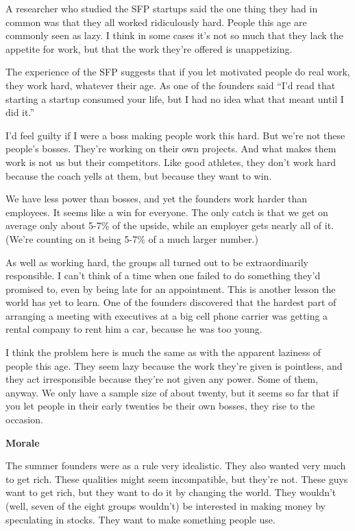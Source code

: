 A researcher who studied the SFP startups said the one thing they had in
common was that they all worked ridiculously hard. People this age are
commonly seen as lazy. I think in some cases it's not so much that they
lack the appetite for work, but that the work they're offered is
unappetizing.

The experience of the SFP suggests that if you let motivated people do
real work, they work hard, whatever their age. As one of the founders
said ``I'd read that starting a startup consumed your life, but I had no
idea what that meant until I did it.''

I'd feel guilty if I were a boss making people work this hard. But we're
not these people's bosses. They're working on their own projects. And
what makes them work is not us but their competitors. Like good
athletes, they don't work hard because the coach yells at them, but
because they want to win.

We have less power than bosses, and yet the founders work harder than
employees. It seems like a win for everyone. The only catch is that we
get on average only about 5-7\% of the upside, while an employer gets
nearly all of it. (We're counting on it being 5-7\% of a much larger
number.)

As well as working hard, the groups all turned out to be extraordinarily
responsible. I can't think of a time when one failed to do something
they'd promised to, even by being late for an appointment. This is
another lesson the world has yet to learn. One of the founders
discovered that the hardest part of arranging a meeting with executives
at a big cell phone carrier was getting a rental company to rent him a
car, because he was too young.

I think the problem here is much the same as with the apparent laziness
of people this age. They seem lazy because the work they're given is
pointless, and they act irresponsible because they're not given any
power. Some of them, anyway. We only have a sample size of about twenty,
but it seems so far that if you let people in their early twenties be
their own bosses, they rise to the occasion.

\textbf{Morale}

The summer founders were as a rule very idealistic. They also wanted
very much to get rich. These qualities might seem incompatible, but
they're not. These guys want to get rich, but they want to do it by
changing the world. They wouldn't (well, seven of the eight groups
wouldn't) be interested in making money by speculating in stocks. They
want to make something people use.

